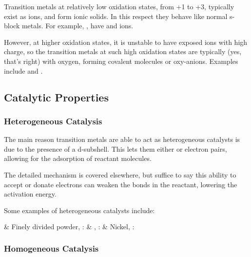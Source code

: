 				Transition metals at relatively low oxidation states, from +1 to +3, typically exist as ions, and form ionic solids. In this
				respect they behave like normal s-block metals. For example, ,  have  and  ions.

				However, at higher oxidation states, it is unstable to have exposed ions with high charge, so the transition metals at such
				high oxidation states are typically  (yes, that's right) with oxygen, forming covalent molecules or
				oxy-anions. Examples include  and .




		\subsection{Catalytic Properties}

			\subsubsection{Heterogeneous Catalysis}

				The main reason transition metals are able to act as heterogeneous catalysts is due to the presence of a 
				d-subshell. This lets them either  or  electron pairs, allowing for the adsorption of reactant molecules.

				The detailed mechanism is covered elsewhere, but suffice to say this ability to accept or donate electrons can weaken the bonds
				in the reactant, lowering the activation energy.

				Some examples of heterogeneous catalysts include:

				\begin{bulletlist}
					& Finely divided  powder, :	\tabto{70mm}
					& , :						\tabto{70mm}
					& Nickel, :					\tabto{70mm}
				\end{bulletlist}




			\subsubsection{Homogeneous Catalysis}


